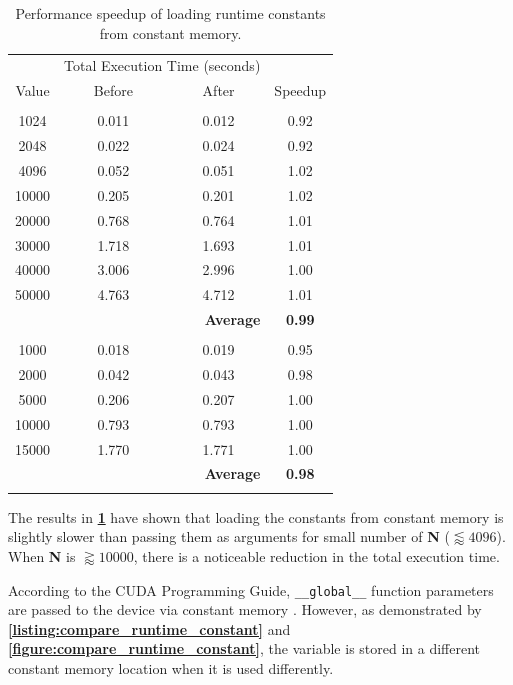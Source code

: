 \documentclass[12pt, a4paper]{article}
\let\oldcref\cref
\renewcommand{\cref}[1]{\textbf{\oldcref{#1}}}
\begin{document}
\renewcommand{\arraystretch}{1.3}
\begin{longtable}{|c|c|c|c|}
  \hline \endfirsthead & \multicolumn{2}{c|}{Total Execution Time (seconds)} & \\ \cline{2-3}
  \multirow{-2}{*}{Value} & Before & After & \multirow{-2}{*}{Speedup} \\ \hline
  \rowcolor{lightgray}\multicolumn{4}{|c|}{\textbf{Number of Bodies (N)}} \\ \hline
  1024  & 0.011 & 0.012 & 0.92 \\
  2048  & 0.022 & 0.024 & 0.92 \\
  4096  & 0.052 & 0.051 & 1.02 \\
  10000 & 0.205 & 0.201 & 1.02 \\
  20000 & 0.768 & 0.764 & 1.01 \\
  30000 & 1.718 & 1.693 & 1.01 \\
  40000 & 3.006 & 2.996 & 1.00 \\
  50000 & 4.763 & 4.712 & 1.01 \\ \hline
  \multicolumn{3}{|r|}{\textbf{Average}} & \textbf{0.99} \\ \hline
  \rowcolor{lightgray}\multicolumn{4}{|c|}{\textbf{Activity Grid Dimension (D)}} \\ \hline
  1000  & 0.018 & 0.019 & 0.95 \\
  2000  & 0.042 & 0.043 & 0.98 \\
  5000  & 0.206 & 0.207 & 1.00 \\
  10000 & 0.793 & 0.793 & 1.00 \\
  15000 & 1.770 & 1.771 & 1.00 \\ \hline
  \multicolumn{3}{|r|}{\textbf{Average}} & \textbf{0.98} \\ \hline
  \caption{Performance speedup of loading runtime constants from constant memory.}
  \label{table:constant_runtime_constants}
\end{longtable}
\renewcommand{\arraystretch}{1}

The results in \cref{table:constant_runtime_constants} have shown that loading the constants from
constant memory is slightly slower than passing them as arguments for small number of \textbf{N}
(\(\lessapprox 4096\)). When \textbf{N} is \(\gtrapprox 10000\), there is a noticeable reduction in
the total execution time.

According to the CUDA Programming Guide, \texttt{__global__} function parameters are
passed to the device via constant memory \cite{func_params}. However, as demonstrated by
\cref{listing:compare_runtime_constant} and \cref{figure:compare_runtime_constant}, the variable is
stored in a different constant memory location when it is used differently.
\end{document}
